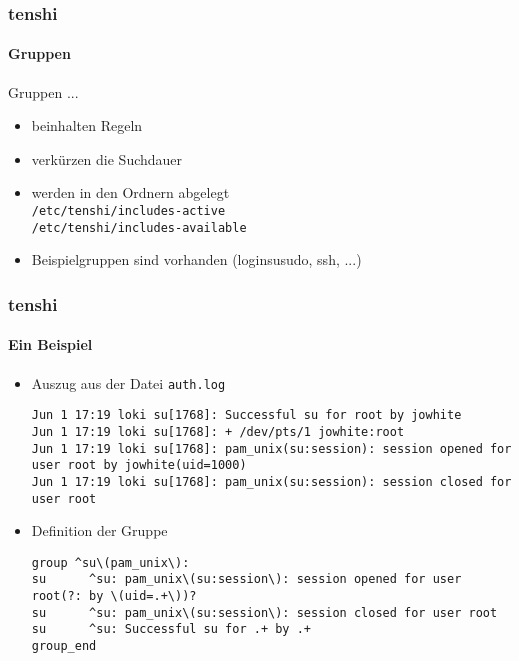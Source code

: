\begin{frame}[fragile]
	\frametitle{tenshi}
	\framesubtitle{Gruppen}
		Gruppen ...
	\begin{itemize}
		\item beinhalten Regeln
		\item verkürzen die Suchdauer
		\item werden in den Ordnern abgelegt \\ 
			\verb|/etc/tenshi/includes-active|\\
			\verb|/etc/tenshi/includes-available|
		\item Beispielgruppen sind vorhanden (loginsusudo, ssh, ...)
	\end{itemize}
\end{frame}

\begin{frame}[fragile]
	\frametitle{tenshi}
	\framesubtitle{Ein Beispiel}
	\begin{itemize}
		\item Auszug aus der Datei \verb|auth.log|
		\begin{block}{}
		\begin{tiny}
			\begin{verbatim}
Jun 1 17:19 loki su[1768]: Successful su for root by jowhite
Jun 1 17:19 loki su[1768]: + /dev/pts/1 jowhite:root
Jun 1 17:19 loki su[1768]: pam_unix(su:session): session opened for user root by jowhite(uid=1000)
Jun 1 17:19 loki su[1768]: pam_unix(su:session): session closed for user root
			\end{verbatim}
		\end{tiny}
		\end{block}
		\item Definition der Gruppe
		\begin{block}{}
		\begin{tiny}
			\begin{verbatim}			
group ^su\(pam_unix\):
su      ^su: pam_unix\(su:session\): session opened for user root(?: by \(uid=.+\))?
su      ^su: pam_unix\(su:session\): session closed for user root
su      ^su: Successful su for .+ by .+
group_end
			\end{verbatim}
		\end{tiny}
		\end{block}
	\end{itemize}
\end{frame}